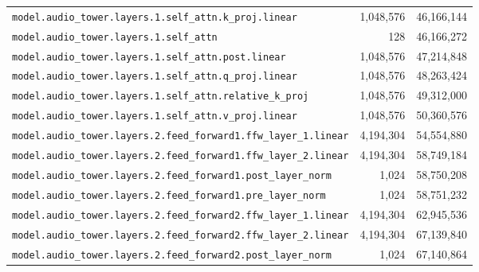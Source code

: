 \documentclass[10pt,a4paper]{article}
\theoremstyle{definition}
\begin{document}
\begin{appendices}
\begin{longtable}{p{9.5cm}rr}
\texttt{model.\allowbreak{}audio\_tower.\allowbreak{}layers.\allowbreak{}1.\allowbreak{}self\_attn.\allowbreak{}k\_proj.\allowbreak{}linear} & 1,048,576 & 46,166,144 \\
\texttt{model.\allowbreak{}audio\_tower.\allowbreak{}layers.\allowbreak{}1.\allowbreak{}self\_attn} & 128 & 46,166,272 \\
\texttt{model.\allowbreak{}audio\_tower.\allowbreak{}layers.\allowbreak{}1.\allowbreak{}self\_attn.\allowbreak{}post.\allowbreak{}linear} & 1,048,576 & 47,214,848 \\
\texttt{model.\allowbreak{}audio\_tower.\allowbreak{}layers.\allowbreak{}1.\allowbreak{}self\_attn.\allowbreak{}q\_proj.\allowbreak{}linear} & 1,048,576 & 48,263,424 \\
\texttt{model.\allowbreak{}audio\_tower.\allowbreak{}layers.\allowbreak{}1.\allowbreak{}self\_attn.\allowbreak{}relative\_k\_proj} & 1,048,576 & 49,312,000 \\
\texttt{model.\allowbreak{}audio\_tower.\allowbreak{}layers.\allowbreak{}1.\allowbreak{}self\_attn.\allowbreak{}v\_proj.\allowbreak{}linear} & 1,048,576 & 50,360,576 \\
\texttt{model.\allowbreak{}audio\_tower.\allowbreak{}layers.\allowbreak{}2.\allowbreak{}feed\_forward1.\allowbreak{}ffw\_layer\_1.\allowbreak{}linear} & 4,194,304 & 54,554,880 \\
\texttt{model.\allowbreak{}audio\_tower.\allowbreak{}layers.\allowbreak{}2.\allowbreak{}feed\_forward1.\allowbreak{}ffw\_layer\_2.\allowbreak{}linear} & 4,194,304 & 58,749,184 \\
\texttt{model.\allowbreak{}audio\_tower.\allowbreak{}layers.\allowbreak{}2.\allowbreak{}feed\_forward1.\allowbreak{}post\_layer\_norm} & 1,024 & 58,750,208 \\
\texttt{model.\allowbreak{}audio\_tower.\allowbreak{}layers.\allowbreak{}2.\allowbreak{}feed\_forward1.\allowbreak{}pre\_layer\_norm} & 1,024 & 58,751,232 \\
\texttt{model.\allowbreak{}audio\_tower.\allowbreak{}layers.\allowbreak{}2.\allowbreak{}feed\_forward2.\allowbreak{}ffw\_layer\_1.\allowbreak{}linear} & 4,194,304 & 62,945,536 \\
\texttt{model.\allowbreak{}audio\_tower.\allowbreak{}layers.\allowbreak{}2.\allowbreak{}feed\_forward2.\allowbreak{}ffw\_layer\_2.\allowbreak{}linear} & 4,194,304 & 67,139,840 \\
\texttt{model.\allowbreak{}audio\_tower.\allowbreak{}layers.\allowbreak{}2.\allowbreak{}feed\_forward2.\allowbreak{}post\_layer\_norm} & 1,024 & 67,140,864 \\

\end{longtable}
\end{appendices}
\end{document}
